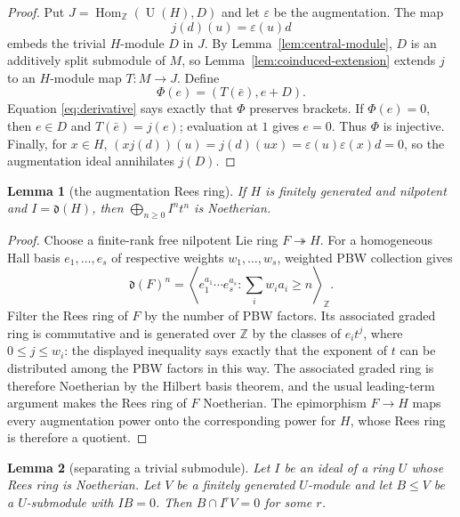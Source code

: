 \documentclass[10pt]{article}
\newtheorem{lemma}{Lemma}
\newcommand{\Z}{\mathbb Z}
\newcommand{\U}{\operatorname U}
\newcommand{\Hom}{\operatorname {Hom}}
\begin{document}
\begin{proof}
Put $J=\Hom_{\Z}(\U(H),D)$ and let $\varepsilon$ be the augmentation.  The
map
\[
                         j(d)(u)=\varepsilon(u)d
\]
embeds the trivial $H$-module $D$ in $J$.  By
Lemma~\ref{lem:central-module}, $D$ is an additively split submodule of $M$,
so Lemma~\ref{lem:coinduced-extension} extends $j$ to an $H$-module map
$T:M\to J$.  Define
\[
                         \Phi(e)=(T(\bar e),e+D).
\]
Equation \eqref{eq:derivative} says exactly that $\Phi$ preserves brackets.
If $\Phi(e)=0$, then $e\in D$ and $T(\bar e)=j(e)$; evaluation at $1$ gives
$e=0$.  Thus $\Phi$ is injective.  Finally, for $x\in H$,
$(xj(d))(u)=j(d)(ux)=\varepsilon(u)\varepsilon(x)d=0$, so the augmentation
ideal annihilates $j(D)$.
\end{proof}

\begin{lemma}[the augmentation Rees ring]\label{lem:rees-noetherian}
If $H$ is finitely generated and nilpotent and $I=\mathfrak d(H)$, then
$\bigoplus_{n\ge0}I^nt^n$ is Noetherian.
\end{lemma}

\begin{proof}
Choose a finite-rank free nilpotent Lie ring $F\twoheadrightarrow H$.  For a
homogeneous Hall basis $e_1,\ldots,e_s$ of respective weights
$w_1,\ldots,w_s$, weighted PBW collection gives
\[
 \mathfrak d(F)^n=
 \left\langle e_1^{a_1}\cdots e_s^{a_s}:
                   \sum_iw_i a_i\ge n\right\rangle_{\Z}.
\]
Filter the Rees ring of $F$ by the number of PBW factors.  Its associated
graded ring is commutative and is generated over $\Z$ by the classes of
$e_it^j$, where $0\le j\le w_i$: the displayed inequality says exactly that
the exponent of $t$ can be distributed among the PBW factors in this way.
The associated graded ring is therefore Noetherian by the Hilbert basis
theorem, and the usual leading-term argument makes the Rees ring of $F$
Noetherian.  The epimorphism $F\to H$ maps every augmentation power onto the
corresponding power for $H$, whose Rees ring is therefore a quotient.
\end{proof}

\begin{lemma}[separating a trivial submodule]\label{lem:rees-separation}
Let $I$ be an ideal of a ring $U$ whose Rees ring is Noetherian.  Let $V$ be
a finitely generated $U$-module and let $B\le V$ be a $U$-submodule with
$IB=0$.  Then $B\cap I^rV=0$ for some $r$.
\end{lemma}
\end{document}
